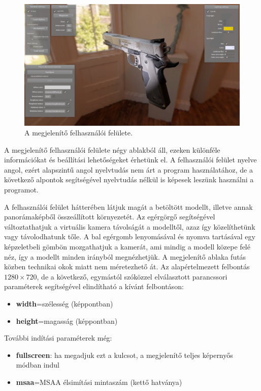 \begin{figure}[!ht]
    \centering
    \includegraphics[width=1.0\textwidth]{images/screenshot.png}
    \caption{A megjelenítő felhasználói felülete.}
\end{figure}

A megjelenítő felhasználói felülete négy ablakból áll, ezeken különféle információkat és beállítási lehetőségeket érhetünk el. A felhasználói felület nyelve angol, ezért alapszintű angol nyelvtudás nem árt a program használatához, de a következő alpontok segítségével nyelvtudás nélkül is képesek leszünk használni a programot.

A felhasználói felület hátterében látjuk magát a betöltött modellt, illetve annak panorámaképből összeállított környezetét. Az egérgörgő segítségével változtathatjuk a virtuális kamera távolságát a modelltől, azaz így közelíthetünk vagy távolodhatunk tőle. A bal egérgomb lenyomásával és nyomva tartásával egy képzeletbeli gömbön mozgathatjuk a kamerát, ami mindig a modell közepe felé néz, így a modellt minden irányból megnézhetjük. A megjelenítő ablaka futás közben technikai okok miatt nem méretezhető át. Az alapértelmezett felbontás \(1280 \times 720\), de a következő, egymástól szóközzel elválasztott parancssori paraméterek segítségével elindítható a kívánt felbontáson:

\begin{itemize}[noitemsep]
\item \textbf{width}=szélesség (képpontban)
\item \textbf{height}=magasság (képpontban)
\end{itemize}

További indítási paraméterek még:

\begin{itemize}[noitemsep]
\item \textbf{fullscreen}: ha megadjuk ezt a kulcsot, a megjelenítő teljes képernyős módban indul
\item \textbf{msaa}=MSAA élsimítási mintaszám (kettő hatványa)
\end{itemize}

